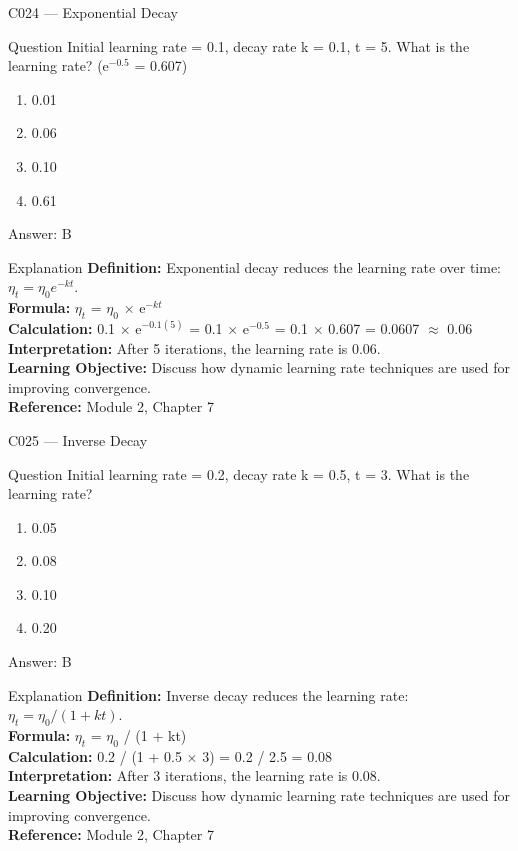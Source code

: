 \documentclass[aspectratio=169,8pt]{beamer}
\begin{document}
	\begin{frame}{C024 --- Exponential Decay}
		\begin{block}{Question}
			Initial learning rate = 0.1, decay rate k = 0.1, t = 5. What is the learning rate? (e$^{-0.5}$ = 0.607)
			\begin{enumerate}
				\item 0.01
				\item 0.06
				\item 0.10
				\item 0.61
			\end{enumerate}
		\end{block}
		\begin{exampleblock}{Answer: B}\end{exampleblock}
		\begin{block}{Explanation}
			\textbf{Definition:} Exponential decay reduces the learning rate over time: $\eta_t = \eta_0 e^{-kt}$.\\
			\textbf{Formula:} $\eta_t$ = $\eta_0$ $\times$ e$^{-kt}$\\
			\textbf{Calculation:} 0.1 $\times$ e$^{-0.1(5)}$ = 0.1 $\times$ e$^{-0.5}$ = 0.1 $\times$ 0.607 = 0.0607 $\approx$ 0.06\\
			\textbf{Interpretation:} After 5 iterations, the learning rate is 0.06.\\
			\textbf{Learning Objective:} Discuss how dynamic learning rate techniques are used for improving convergence.\\
			\textbf{Reference:} Module 2, Chapter 7
		\end{block}
	\end{frame}
	
	\begin{frame}{C025 --- Inverse Decay}
		\begin{block}{Question}
			Initial learning rate = 0.2, decay rate k = 0.5, t = 3. What is the learning rate?
			\begin{enumerate}
				\item 0.05
				\item 0.08
				\item 0.10
				\item 0.20
			\end{enumerate}
		\end{block}
		\begin{exampleblock}{Answer: B}\end{exampleblock}
		\begin{block}{Explanation}
			\textbf{Definition:} Inverse decay reduces the learning rate: $\eta_t = \eta_0 / (1 + kt)$.\\
			\textbf{Formula:} $\eta_t$ = $\eta_0$ / (1 + kt)\\
			\textbf{Calculation:} 0.2 / (1 + 0.5 $\times$ 3) = 0.2 / 2.5 = 0.08\\
			\textbf{Interpretation:} After 3 iterations, the learning rate is 0.08.\\
			\textbf{Learning Objective:} Discuss how dynamic learning rate techniques are used for improving convergence.\\
			\textbf{Reference:} Module 2, Chapter 7
		\end{block}
	\end{frame}
	
\end{document}
